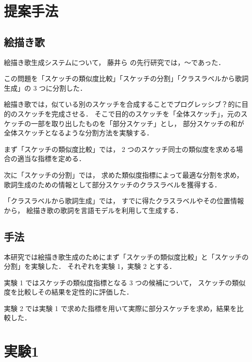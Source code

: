 \documentclass[twocolumn]{jarticle}     %
\begin{document}
\section{提案手法}

\subsection{絵描き歌}
絵描き歌生成システムについて，
藤井ら \cite{} の先行研究では，～であった．

この問題を「スケッチの類似度比較」「スケッチの分割」「クラスラベルから歌詞生成」の 3 つに分割した．

絵描き歌では，似ている別のスケッチを合成することでプログレッシブ？的に目的のスケッチを完成させる．
そこで目的のスケッチを「全体スケッチ」，元のスケッチの一部を取り出したものを「部分スケッチ」とし，
部分スケッチの和が全体スケッチとなるような分割方法を実験する．

まず「スケッチの類似度比較」では，
2 つのスケッチ同士の類似度を求める場合の適当な指標を定める．

次に「スケッチの分割」では，
求めた類似度指標によって最適な分割を求め，
歌詞生成のための情報として部分スケッチのクラスラベルを獲得する．

「クラスラベルから歌詞生成」では，
すでに得たクラスラベルやその位置情報から，
絵描き歌の歌詞を言語モデルを利用して生成する．

\subsection{手法}
本研究では絵描き歌生成のためにまず「スケッチの類似度比較」と「スケッチの分割」を実験した．
それぞれを実験 1，実験 2 とする．

実験 1 ではスケッチの類似度指標となる 3 つの候補について，
スケッチの類似度を比較しその結果を定性的に評価した．

実験 2 では実験 1 で求めた指標を用いて実際に部分スケッチを求め，結果を比較した．


\section{実験1}
\end{document}

